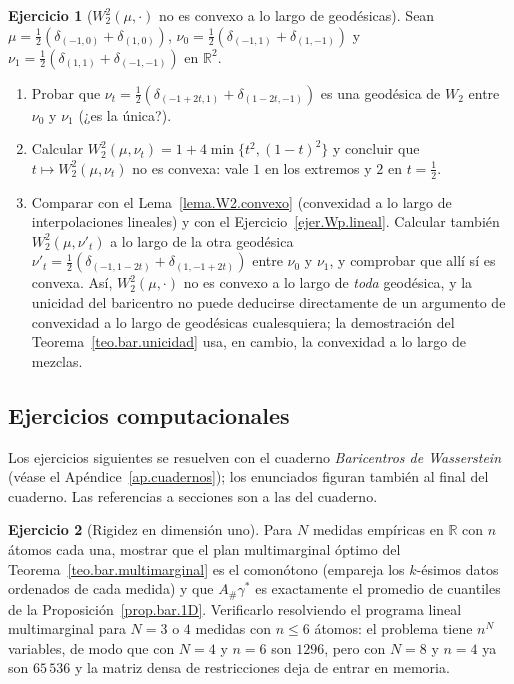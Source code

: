\documentclass[12pt, a4paper]{amsbook}
\newcommand{\R}{{\mathbb R}}
\theoremstyle{remark}
\theoremstyle{definition}
\newtheorem{ejercicio}{Ejercicio}[chapter]
\numberwithin{section}{chapter}
\numberwithin{subsection}{section}
\numberwithin{equation}{section}
\numberwithin{figure}{chapter}
\begin{document}
\begin{ejercicio}[$W_2^2(\mu,\cdot)$ no es convexo a lo largo de geodésicas]\label{ejer.bar.no.convexa.geodesica}
Sean $\mu=\frac12(\delta_{(-1,0)}+\delta_{(1,0)})$,
$\nu_0=\frac12(\delta_{(-1,1)}+\delta_{(1,-1)})$ y
$\nu_1=\frac12(\delta_{(1,1)}+\delta_{(-1,-1)})$ en $\R^2$.
\begin{enumerate}[label=(\alph*)]
\item Probar que $\nu_t=\frac12(\delta_{(-1+2t,1)}+\delta_{(1-2t,-1)})$ es una
geodésica de $W_2$ entre $\nu_0$ y $\nu_1$ (¿es la única?).
\item Calcular $W_2^2(\mu,\nu_t)=1+4\min\{t^2,(1-t)^2\}$ y concluir que
$t\mapsto W_2^2(\mu,\nu_t)$ no es convexa: vale $1$ en los extremos y $2$ en
$t=\frac12$.
\item Comparar con el Lema~\ref{lema.W2.convexo} (convexidad a lo largo de
interpolaciones lineales) y con el Ejercicio~\ref{ejer.Wp.lineal}. Calcular
también $W_2^2(\mu,\nu'_t)$ a lo largo de la otra geodésica
$\nu'_t=\frac12(\delta_{(-1,1-2t)}+\delta_{(1,-1+2t)})$ entre $\nu_0$ y $\nu_1$,
y comprobar que allí sí es convexa. Así, $W_2^2(\mu,\cdot)$ no es convexo a
lo largo de \emph{toda} geodésica, y la unicidad del baricentro no puede
deducirse directamente de un argumento de convexidad a lo largo de
geodésicas cualesquiera; la demostración del Teorema~\ref{teo.bar.unicidad}
usa, en cambio, la convexidad a lo largo de mezclas.
\end{enumerate}
\end{ejercicio}

\subsection*{Ejercicios computacionales}

Los ejercicios siguientes se resuelven con el cuaderno \emph{Baricentros de
Wasserstein} (véase el Apéndice~\ref{ap.cuadernos}); los enunciados figuran
también al final del cuaderno. Las referencias a secciones son a las del
cuaderno.

\begin{ejercicio}[Rigidez en dimensión uno]\label{ejc.bar.1D}
Para $N$ medidas empíricas en $\R$ con $n$ átomos cada una, mostrar que el
plan multimarginal óptimo del Teorema~\ref{teo.bar.multimarginal} es el
comonótono (empareja los $k$-ésimos datos ordenados de cada medida) y que
$A_\#\gamma^*$ es exactamente el promedio de cuantiles de la
Proposición~\ref{prop.bar.1D}. Verificarlo resolviendo el programa lineal
multimarginal para $N=3$ o $4$ medidas con $n\le6$ átomos: el problema tiene
$n^N$ variables, de modo que con $N=4$ y $n=6$ son $1296$, pero con $N=8$ y
$n=4$ ya son $65\,536$ y la matriz densa de restricciones deja de entrar en
memoria.
\end{ejercicio}
\end{document}
